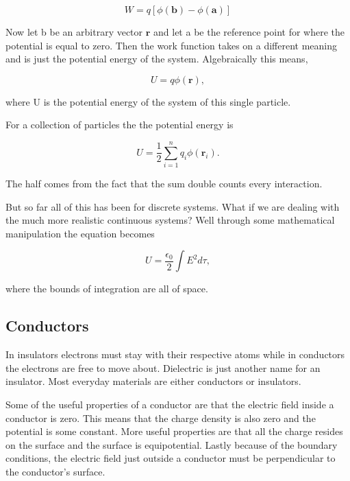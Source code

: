 \documentclass[preprint, review,12pt]{elsarticle}
\def\b{\textbf}
\begin{document}
\begin{equation}
    W = q[\phi(\b{b})-\phi(\b{a})]
\end{equation}

Now let b be an arbitrary vector $\b{r}$ and let a be the reference point for where the potential is equal to zero. Then the work function takes on a different meaning and is just the potential energy of the system. Algebraically this means,

\begin{equation}
    U = q\phi(\b{r}),
\end{equation}

where U is the potential energy of the system of this single particle.

For a collection of particles the the potential energy is

\begin{equation}
    U = \frac{1}{2}\sum_{i=1}^n q_i \phi(\b{r}_i).
\end{equation}

The half comes from the fact that the sum double counts every interaction.

But so far all of this has been for discrete systems. What if we are dealing with the much more realistic continuous systems? Well through some mathematical manipulation the equation becomes 

\begin{equation}
    U = \frac{\epsilon_0}{2}\int E^2 d\tau, 
\end{equation}

where the bounds of integration are all of space.

\subsection{Conductors}

In insulators electrons must stay with their respective atoms while in conductors the electrons are free to move about. Dielectric is just another name for an insulator. Most everyday materials are either conductors or insulators. 

Some of the useful properties of a conductor are that the electric field inside a conductor is zero. This means that the charge density is also zero and the potential is some constant. More useful properties are that all the charge resides on the surface and the surface is equipotential. Lastly because of the boundary conditions, the electric field just outside a conductor must be perpendicular to the conductor's surface. 
\end{document}
